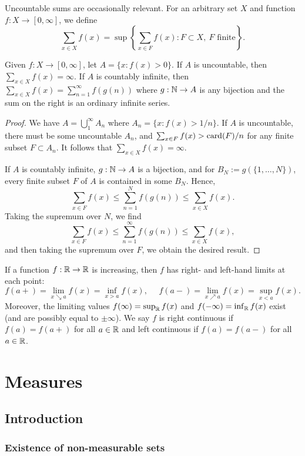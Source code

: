 \documentclass[12pt]{article} %
\begin{document}
Uncountable sums are occasionally relevant. For an arbitrary set $X$ and function $f : X \to [0,\infty]$, we define \[\sum_{x \in X} f(x) = \sup \left\{\sum_{x \in F} f(x) : F \subset X, \ \text{$F$ finite}\right\}.\]

\begin{proposition}
    Given $f : X \to [0,\infty]$, let $A = \{x : f(x) > 0\}$. If $A$ is uncountable, then $\sum_{x \in X}f(x) = \infty$. If $A$ is countably infinite, then $\sum_{x \in X} f(x) = \sum_{n=1}^{\infty}f(g(n))$ where $g : \mathbb{N} \to A$ is any bijection and the sum on the right is an ordinary infinite series.
\end{proposition}

\begin{proof}
    We have $A = \bigcup_{1}^{\infty} A_n$ where $A_n = \{x : f(x) > 1/n\}$. If $A$ is uncountable, there must be some uncountable $A_n$, and $\sum_{x \in F}f(x) > \operatorname{card}(F) / n$ for any finite subset $F \subset A_n$. It follows that $\sum_{x \in X}f(x) = \infty$.

    If $A$ is countably infinite, $g : \mathbb{N} \to A$ is a bijection, and for $B_N := g(\{1, \ldots, N\})$, every finite subset $F$ of $A$ is contained in some $B_N$. Hence, \[\sum_{x \in F} f(x) \leq \sum_{n=1}^{N} f(g(n)) \leq \sum_{x \in X} f(x).\] Taking the supremum over $N$, we find \[\sum_{x \in F} f(x) \leq \sum_{n=1}^{\infty} f(g(n)) \leq \sum_{x \in X} f(x),\] and then taking the supremum over $F$, we obtain the desired result.
\end{proof}

If a function $f : \mathbb{R} \to \mathbb{R}$ is increasing, then $f$ has right- and left-hand limits at each point: \[f(a+) = \lim_{x \searrow a} f(x) = \inf_{x > a} f(x), \ \ \ \ \ \ f(a-) = \lim_{x \nearrow a} f(x) = \sup_{x < a} f(x).\] Moreover, the limiting values $f(\infty) = \sup_{\mathbb{R}} f(x)$ and $f(-\infty) = \inf_{\mathbb{R}} f(x)$ exist (and are possibly equal to $\pm \infty$). We say $f$ is right continuous if $f(a) = f(a+)$ for all $a \in \mathbb{R}$ and left continuous if $f(a) = f(a-)$ for all $a \in \mathbb{R}$.

\section{Measures}

\subsection{Introduction}

\subsubsection{Existence of non-measurable sets}
\end{document}
